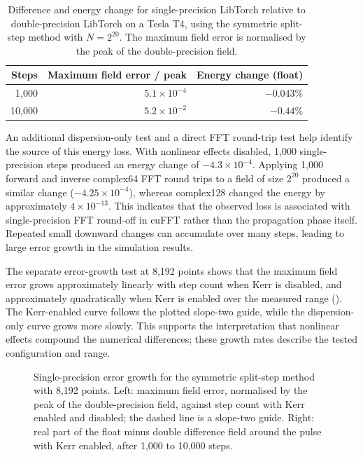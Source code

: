 \begin{table}[H]
  \centering
  \caption{Difference and energy change for single-precision LibTorch relative to
  double-precision LibTorch on a Tesla T4, using the symmetric split-step method with
  $N=2^{20}$. The maximum field error is normalised by the peak of the double-precision
  field.}
  \label{tab:precision-error}
  \begin{tabular}{rrr}
    \toprule
    Steps & Maximum field error / peak & Energy change (float) \\
    \midrule
    1,000 & $5.1\times10^{-4}$ & $-0.043\%$ \\
    10,000 & $5.2\times10^{-2}$ & $-0.44\%$ \\
    \bottomrule
  \end{tabular}
\end{table}

An additional dispersion-only test and a direct FFT round-trip test help identify the source
of this energy loss. With nonlinear effects disabled, 1,000 single-precision steps produced
an energy change of $-4.3\times10^{-4}$. Applying 1,000 forward and inverse complex64 FFT
round trips to a field of size $2^{20}$ produced a similar change ($-4.25\times10^{-4}$),
whereas complex128 changed the energy by approximately $4\times10^{-13}$. This indicates
that the observed loss is associated with single-precision FFT round-off in cuFFT rather
than the propagation phase itself. Repeated small downward changes can accumulate over many
steps, leading to large error growth in the simulation results.

The separate error-growth test at 8,192 points shows that the maximum field error
grows approximately linearly with step count when Kerr is disabled, and approximately
quadratically when Kerr is enabled over the measured range (). The Kerr-enabled curve follows
the plotted slope-two guide, while the dispersion-only curve grows more slowly. This supports
the interpretation that nonlinear effects compound the numerical differences; these growth
rates describe the tested configuration and range.

\begin{figure}
  \centering
  \caption[Single-precision error growth]{Single-precision error growth for the symmetric
  split-step method with 8,192 points. Left: maximum field error, normalised by the peak of
  the double-precision field, against step count with Kerr enabled and disabled; the dashed
  line is a slope-two guide. Right: real part of the float minus double difference field
  around the pulse with Kerr enabled, after 1,000 to 10,000 steps.}
  \label{fig:floatLoss}
\end{figure}

